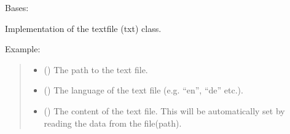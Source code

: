 \documentclass[letterpaper,10pt,english]{sphinxmanual}
\begin{document}
\begin{fulllineitems}
\label{\detokenize{generated/bp_text.txt:bp_text.txt.TxtFile}}
\pysigstartsignatures
\pysiglinewithargsret
{}
{\sphinxparamcomma {}\sphinxparamcomma {}}
{}
\pysigstopsignatures
\sphinxAtStartPar
Bases: 

\sphinxAtStartPar
Implementation of the text\sphinxhyphen{}file (txt) class.

\sphinxAtStartPar
Example:

\begin{sphinxVerbatim}[commandchars=\\\{\}]
  
\end{sphinxVerbatim}
\begin{quote}\begin{description}
\begin{itemize}
\item {} 
\sphinxAtStartPar
{} () \textendash{} The path to the text file.

\item {} 
\sphinxAtStartPar
{} () \textendash{} The language of the text file (e.g. “en”, “de” etc.).

\item {} 
\sphinxAtStartPar
{} () \textendash{} The content of the text file. This will be automatically set
by reading the data from the file(\sphinxhyphen{}path).


\end{itemize}
\end{description}
\end{quote}
\end{fulllineitems}
\end{document}
